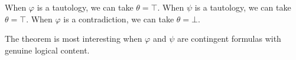 \begin{remark}
When $\varphi$ is a tautology, we can take $\theta = \top$.
When $\psi$ is a tautology, we can take $\theta = \top$.
When $\varphi$ is a contradiction, we can take $\theta = \bot$.

The theorem is most interesting when $\varphi$ and $\psi$ are contingent formulas
with genuine logical content.
\end{remark}


